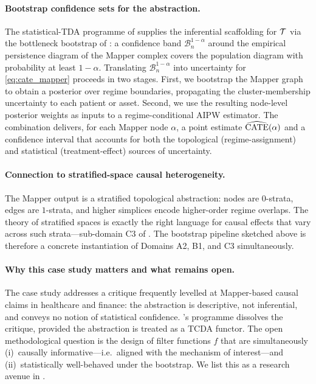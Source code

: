 \paragraph{Bootstrap confidence sets for the abstraction.}
The statistical-TDA programme of \citet{lecci2014statistical} supplies
the inferential scaffolding for $\mathcal{T}$ via the bottleneck bootstrap of
\citet{fasy2014confidence,chazal2013bootstrap}: a confidence band
$\mathcal{B}_n^{1-\alpha}$ around the empirical persistence diagram of
the Mapper complex covers the population diagram with probability at
least $1 - \alpha$. Translating $\mathcal{B}_n^{1-\alpha}$ into
uncertainty for \cref{eq:cate_mapper} proceeds in two stages. First,
we bootstrap the Mapper graph to obtain a posterior over regime
boundaries, propagating the cluster-membership uncertainty to each
patient or asset. Second, we use the resulting node-level posterior
weights as inputs to a regime-conditional AIPW estimator. The
combination delivers, for each Mapper node $\alpha$, a point estimate
$\widehat{\operatorname{CATE}}(\alpha)$ and a confidence interval that accounts for
both the topological (regime-assignment) and statistical
(treatment-effect) sources of uncertainty.

\paragraph{Connection to stratified-space causal heterogeneity.}
The Mapper output is a stratified topological abstraction: nodes are
$0$-strata, edges are $1$-strata, and higher simplices encode
higher-order regime overlaps. The theory of stratified spaces
\citep{hughes2004stratified,banagl2007topological,chazal2013persistence}
is exactly the right language for causal effects that vary across such
strata---sub-domain C3 of . The bootstrap pipeline
sketched above is therefore a concrete instantiation of Domains A2,
B1, and C3 simultaneously.

\paragraph{Why this case study matters and what remains open.}
The case study addresses a critique frequently levelled at
Mapper-based causal claims in healthcare and finance: the abstraction
is descriptive, not inferential, and conveys no notion of statistical
confidence. \citet{lecci2014statistical}'s programme dissolves the
critique, provided the abstraction is treated as a TCDA functor. The
open methodological question is the design of filter functions $f$
that are simultaneously (i)~causally informative---i.e.\ aligned with
the mechanism of interest---and (ii)~statistically well-behaved under
the bootstrap. We list this as a research avenue in .

